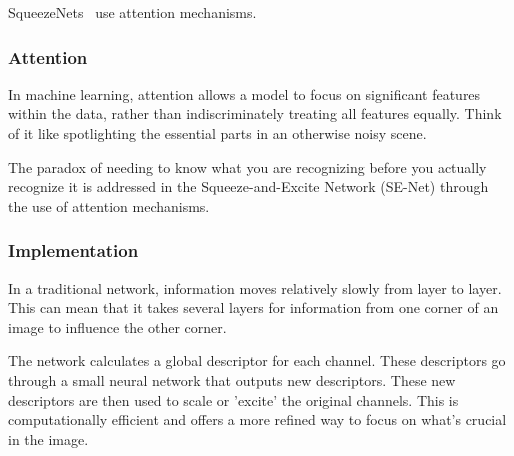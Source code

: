 \documentclass[11pt]{article}
\begin{document}
SqueezeNets~\cite{SqueezeNet} use attention mechanisms. 

\subsubsection{Attention}

In machine learning, attention allows a model to focus on significant features within the data, rather than indiscriminately treating all features equally. Think of it like spotlighting the essential parts in an otherwise noisy scene.

The paradox of needing to know what you are recognizing before you actually recognize it is addressed in the Squeeze-and-Excite Network (SE-Net) through the use of attention mechanisms.

\subsubsection{Implementation}

In a traditional network, information moves relatively slowly from layer to layer. This can mean that it takes several layers for information from one corner of an image to influence the other corner.

The network calculates a global descriptor for each channel. These descriptors go through a small neural network that outputs new descriptors. These new descriptors are then used to scale or 'excite' the original channels. This is computationally efficient and offers a more refined way to focus on what's crucial in the image.
\end{document}
